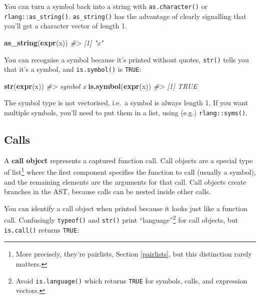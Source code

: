 \documentclass[]{book}
\makeatletter
\newenvironment{Shaded}{\begin{snugshade}}{\end{snugshade}}
\newcommand{\CommentTok}[1]{\textcolor[rgb]{0.37,0.37,0.37}{\textit{#1}}}
\newcommand{\KeywordTok}[1]{\textcolor[rgb]{0.27,0.27,0.27}{\textbf{#1}}}
\newcommand{\NormalTok}[1]{#1}
\let\rmarkdownfootnote\footnote%
\def\footnote{\protect\rmarkdownfootnote}
\newcommand{\indexc}[1]{\index{#1@\texttt{#1}}}
\makeatother
\begin{document}
\indexc{as\_string()}

You can turn a symbol back into a string with \texttt{as.character()} or \texttt{rlang::as\_string()}. \texttt{as\_string()} has the advantage of clearly signalling that you'll get a character vector of length 1.

\begin{Shaded}
\begin{Highlighting}[]
\KeywordTok{as_string}\NormalTok{(}\KeywordTok{expr}\NormalTok{(x))}
\CommentTok{#> [1] "x"}
\end{Highlighting}
\end{Shaded}

You can recognise a symbol because it's printed without quotes, \texttt{str()} tells you that it's a symbol, and \texttt{is.symbol()} is \texttt{TRUE}:

\begin{Shaded}
\begin{Highlighting}[]
\KeywordTok{str}\NormalTok{(}\KeywordTok{expr}\NormalTok{(x))}
\CommentTok{#>  symbol x}
\KeywordTok{is.symbol}\NormalTok{(}\KeywordTok{expr}\NormalTok{(x))}
\CommentTok{#> [1] TRUE}
\end{Highlighting}
\end{Shaded}

The symbol type is not vectorised, i.e.~a symbol is always length 1. If you want multiple symbols, you'll need to put them in a list, using (e.g.) \texttt{rlang::syms()}.

\hypertarget{calls}{%
\subsection{Calls}\label{calls}}


A \textbf{call object} represents a captured function call. Call objects are a special type of list\footnote{More precisely, they're pairlists, Section \ref{pairlists}, but this distinction rarely matters.} where the first component specifies the function to call (usually a symbol), and the remaining elements are the arguments for that call. Call objects create branches in the AST, because calls can be nested inside other calls.

You can identify a call object when printed because it looks just like a function call. Confusingly \texttt{typeof()} and \texttt{str()} print ``language''\footnote{Avoid \texttt{is.language()} which returns \texttt{TRUE} for symbols, calls, and expression vectors.} for call objects, but \texttt{is.call()} returns \texttt{TRUE}:
\end{document}
